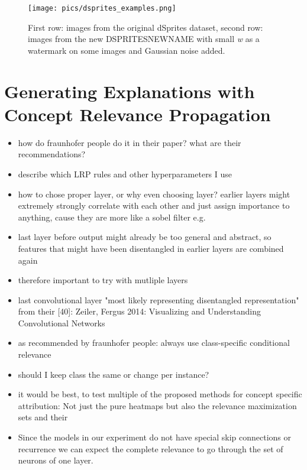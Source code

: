 \begin{figure}[H]
    \centering
    \texttt{[image: pics/dsprites\_examples.png]}
    \caption{First row: images from the original dSprites dataset, second row: images from the new DSPRITESNEWNAME with small \textit{w} as a watermark on some images and Gaussian noise added.}
    \label{fig:dsprites_examples}
\end{figure}

\section{Generating Explanations with Concept Relevance Propagation}

\begin{itemize}
    \item how do fraunhofer people do it in their paper? what are their recommendations?
    \item describe which LRP rules and other hyperparameters I use
    \item how to chose proper layer, or why even choosing layer? 
    earlier layers might extremely strongly correlate with each other and just assign importance to anything, cause they are more like a sobel filter e.g.
    \item last layer before output might already be too general and abstract, so features that might have been disentangled in earlier layers are combined again
    \item therefore important to try with mutliple layers
    \item \cite{Dreyer2023a} last convolutional layer "most likely representing disentangled representation" from their [40]: Zeiler, Fergus 2014: Visualizing and Understanding Convolutional Networks
    \item as recommended by fraunhofer people: always use class-specific conditional relevance
    \item should I keep class the same or change per instance?
    \item it would be best, to test multiple of the proposed methods for concept specific attribution: Not just the pure heatmaps but also the relevance maximization sets and their 
    \item Since the models in our experiment do not have special skip connections or recurrence we can expect the complete relevance to go through the set of neurons of one layer. 
    
\end{itemize}

